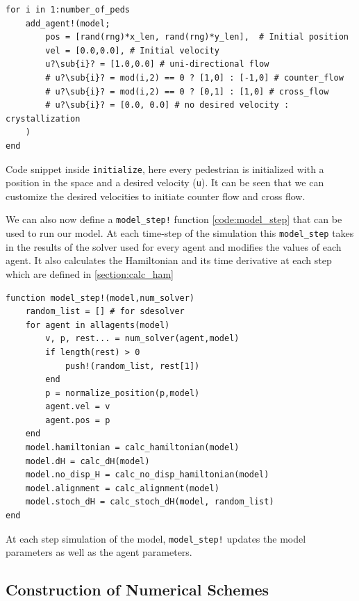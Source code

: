 \begin{listing}[H]
\begin{verbatim}
for i in 1:number_of_peds
    add_agent!(model;
        pos = [rand(rng)*x_len, rand(rng)*y_len],  # Initial position
        vel = [0.0,0.0], # Initial velocity
        u?\sub{i}? = [1.0,0.0] # uni-directional flow
        # u?\sub{i}? = mod(i,2) == 0 ? [1,0] : [-1,0] # counter_flow
        # u?\sub{i}? = mod(i,2) == 0 ? [0,1] : [1,0] # cross_flow
        # u?\sub{i}? = [0.0, 0.0] # no desired velocity : crystallization
    )
end
\end{verbatim}
\caption{Code snippet inside \texttt{initialize}, here every pedestrian is initialized with a position in the space and a desired velocity (\texttt{u}). It can be seen that we can customize the desired velocities to initiate counter flow and cross flow. }
\label{code:agent_init}
\end{listing}

We can also now define a \texttt{model\_step!} function \autoref{code:model_step} that can be used to run our model. At each time-step of the simulation this \texttt{model\_step} takes in the results of the solver used for every agent and modifies the values of each agent. It also calculates the Hamiltonian and its time derivative at each step which are defined in \autoref{section:calc_ham}
\begin{listing}[H]
\begin{verbatim}
function model_step!(model,num_solver)
    random_list = [] # for sdesolver
    for agent in allagents(model)
        v, p, rest... = num_solver(agent,model)
        if length(rest) > 0
            push!(random_list, rest[1])
        end
        p = normalize_position(p,model)
        agent.vel = v
        agent.pos = p
    end
    model.hamiltonian = calc_hamiltonian(model)
    model.dH = calc_dH(model)
    model.no_disp_H = calc_no_disp_hamiltonian(model)
    model.alignment = calc_alignment(model)
    model.stoch_dH = calc_stoch_dH(model, random_list)
end
\end{verbatim}
\caption{At each step simulation of the model, \texttt{model\_step!} updates the model parameters as well as the agent parameters.}
\label{code:model_step}
\end{listing}


\subsection{Construction of Numerical Schemes}
\label{section:numerical_schemes}

